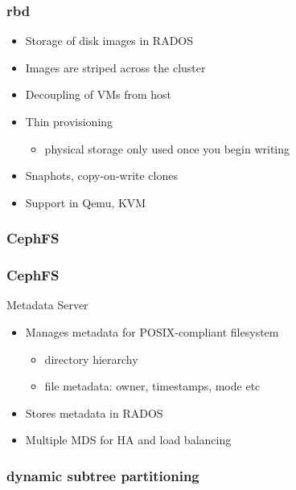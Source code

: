\documentclass[10pt, compress]{beamer}
\begin{document}
\begin{frame}[fragile]
    \frametitle{rbd}
    \begin{itemize}
        \item Storage of disk images in RADOS
        \item Images are striped across the cluster
        \item Decoupling of VMs from host
        \item Thin provisioning
            \begin{itemize}
                \item physical storage only used once you begin writing
            \end{itemize}
        \item Snaphots, copy-on-write clones
        \item Support in Qemu, KVM
    \end{itemize}
\end{frame}

\begin{frame}[fragile]
    \frametitle{CephFS}
    \begin{center}
        
    \end{center}
\end{frame}

\begin{frame}[fragile]
    \frametitle{CephFS}
    \begin{block}{Metadata Server}
        \begin{itemize}
            \item Manages metadata for POSIX-compliant filesystem
                \begin{itemize}
                    \item directory hierarchy
                    \item file metadata: owner, timestamps, mode etc
                \end{itemize}
            \item Stores metadata in RADOS
            \item Multiple MDS for HA and load balancing
        \end{itemize}
    \end{block}
\end{frame}

\begin{frame}[fragile]
    \frametitle{dynamic subtree partitioning}
    \begin{center}
        
    \end{center}
\end{frame}
\end{document}
